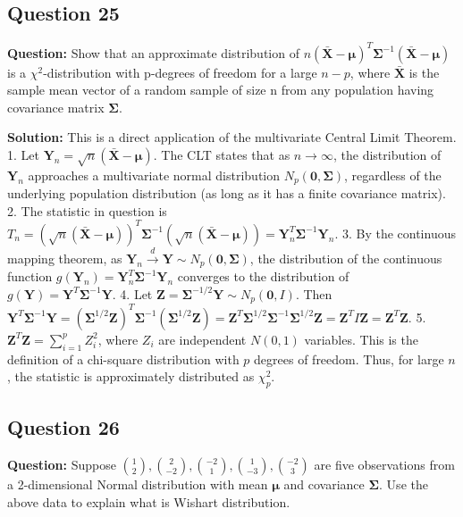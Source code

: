 \subsection*{Question 25}
\textbf{Question:} Show that an approximate distribution of $n(\bar{\mathbf{X}} - \boldsymbol{\mu})^T \boldsymbol{\Sigma}^{-1} (\bar{\mathbf{X}} - \boldsymbol{\mu})$ is a $\chi^2$-distribution with p-degrees of freedom for a large $n-p$, where $\bar{\mathbf{X}}$ is the sample mean vector of a random sample of size n from any population having covariance matrix $\boldsymbol{\Sigma}$.

\textbf{Solution:}
This is a direct application of the multivariate Central Limit Theorem.
1.  Let $\mathbf{Y}_n = \sqrt{n}(\bar{\mathbf{X}} - \boldsymbol{\mu})$. The CLT states that as $n \to \infty$, the distribution of $\mathbf{Y}_n$ approaches a multivariate normal distribution $N_p(\mathbf{0}, \boldsymbol{\Sigma})$, regardless of the underlying population distribution (as long as it has a finite covariance matrix).
2.  The statistic in question is $T_n = (\sqrt{n}(\bar{\mathbf{X}} - \boldsymbol{\mu}))^T \boldsymbol{\Sigma}^{-1} (\sqrt{n}(\bar{\mathbf{X}} - \boldsymbol{\mu})) = \mathbf{Y}_n^T \boldsymbol{\Sigma}^{-1} \mathbf{Y}_n$.
3.  By the continuous mapping theorem, as $\mathbf{Y}_n \xrightarrow{d} \mathbf{Y} \sim N_p(\mathbf{0}, \boldsymbol{\Sigma})$, the distribution of the continuous function $g(\mathbf{Y}_n) = \mathbf{Y}_n^T \boldsymbol{\Sigma}^{-1} \mathbf{Y}_n$ converges to the distribution of $g(\mathbf{Y}) = \mathbf{Y}^T \boldsymbol{\Sigma}^{-1} \mathbf{Y}$.
4.  Let $\mathbf{Z} = \boldsymbol{\Sigma}^{-1/2}\mathbf{Y} \sim N_p(\mathbf{0}, I)$. Then $\mathbf{Y}^T\boldsymbol{\Sigma}^{-1}\mathbf{Y} = (\boldsymbol{\Sigma}^{1/2}\mathbf{Z})^T \boldsymbol{\Sigma}^{-1} (\boldsymbol{\Sigma}^{1/2}\mathbf{Z}) = \mathbf{Z}^T\boldsymbol{\Sigma}^{1/2}\boldsymbol{\Sigma}^{-1}\boldsymbol{\Sigma}^{1/2}\mathbf{Z} = \mathbf{Z}^T I \mathbf{Z} = \mathbf{Z}^T\mathbf{Z}$.
5.  $\mathbf{Z}^T\mathbf{Z} = \sum_{i=1}^p Z_i^2$, where $Z_i$ are independent $N(0,1)$ variables. This is the definition of a chi-square distribution with $p$ degrees of freedom.
Thus, for large $n$, the statistic is approximately distributed as $\chi^2_p$.

\subsection*{Question 26}
\textbf{Question:} Suppose $\binom{1}{2}, \binom{2}{-2}, \binom{-2}{1}, \binom{1}{-3}, \binom{-2}{3}$ are five observations from a 2-dimensional Normal distribution with mean $\boldsymbol{\mu}$ and covariance $\boldsymbol{\Sigma}$. Use the above data to explain what is Wishart distribution.

